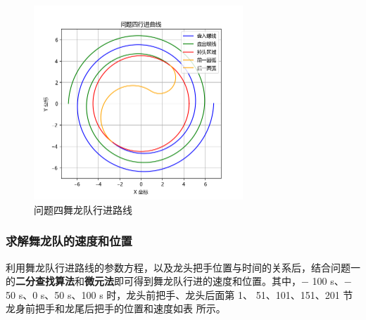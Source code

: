 \documentclass[a4paper]{article}
\begin{document}
		\begin{figure}[H]
			\centering
			\includegraphics[width=0.7\textwidth]{image/Figure_5412.png}
			\caption{问题四舞龙队行进路线}
			\label{Figure_5412}
		\end{figure}
	
	\subsubsection{求解舞龙队的速度和位置}
	
		利用舞龙队行进路线的参数方程，以及龙头把手位置与时间的关系后，结合问题一的\textbf{二分查找算法}和\textbf{微元法}即可得到舞龙队行进的速度和位置。其中，− 100 s、− 50 s、0 s、50 s、100 s 时，龙头前把手、龙头后面第 1、
		51、101、151、201 节龙身前把手和龙尾后把手的位置和速度如表%
		所示。
\end{document}
